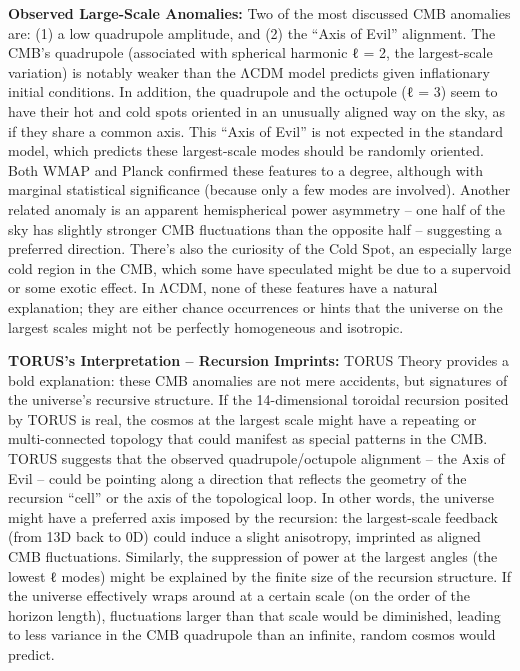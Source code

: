 \documentclass[
]{article}
\begin{document}
\textbf{Observed Large-Scale Anomalies:} Two of the most discussed CMB
anomalies are: (1) a low quadrupole amplitude, and (2) the ``Axis of
Evil'' alignment. The CMB's quadrupole (associated with spherical
harmonic ℓ = 2, the largest-scale variation) is notably weaker than the
ΛCDM model predicts given inflationary initial conditions. In addition,
the quadrupole and the octupole (ℓ = 3) seem to have their hot and cold
spots oriented in an unusually aligned way on the sky, as if they share
a common axis. This ``Axis of Evil'' is not expected in the standard
model, which predicts these largest-scale modes should be randomly
oriented. Both WMAP and Planck confirmed these features to a degree,
although with marginal statistical significance (because only a few
modes are involved). Another related anomaly is an apparent
hemispherical power asymmetry -- one half of the sky has slightly
stronger CMB fluctuations than the opposite half -- suggesting a
preferred direction. There's also the curiosity of the Cold Spot, an
especially large cold region in the CMB, which some have speculated
might be due to a supervoid or some exotic effect. In ΛCDM, none of
these features have a natural explanation; they are either chance
occurrences or hints that the universe on the largest scales might not
be perfectly homogeneous and isotropic.

\textbf{TORUS's Interpretation -- Recursion Imprints:} TORUS Theory
provides a bold explanation: these CMB anomalies are not mere accidents,
but signatures of the universe's recursive structure. If the
14-dimensional toroidal recursion posited by TORUS is real, the cosmos
at the largest scale might have a repeating or multi-connected topology
that could manifest as special patterns in the CMB. TORUS suggests that
the observed quadrupole/octupole alignment -- the Axis of Evil -- could
be pointing along a direction that reflects the geometry of the
recursion ``cell'' or the axis of the topological loop. In other words,
the universe might have a preferred axis imposed by the recursion: the
largest-scale feedback (from 13D back to 0D) could induce a slight
anisotropy, imprinted as aligned CMB fluctuations. Similarly, the
suppression of power at the largest angles (the lowest ℓ modes) might be
explained by the finite size of the recursion structure. If the universe
effectively wraps around at a certain scale (on the order of the horizon
length), fluctuations larger than that scale would be diminished,
leading to less variance in the CMB quadrupole than an infinite, random
cosmos would predict.
\end{document}
